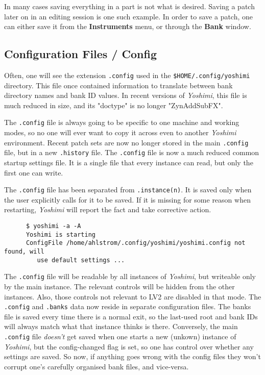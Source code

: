    In many cases saving everything in a part is not what is desired.
   Saving a patch later on in an editing session is one such example.
   In order to save a patch, one can either save it from the
   \textbf{Instruments} menu, or through the \textbf{Bank} window.

\subsection{Configuration Files / Config}
\label{subsec:configuration_config}

   Often, one will see the extension \texttt{.config} used in the
   \texttt{\$HOME/.config/yoshimi} directory.  This file once contained
   information to translate between bank directory names and bank ID
   values.  In recent versions of \textsl{Yoshimi}, this file is much
   reduced in size, and its "doctype" is no longer "ZynAddSubFX".

   The \texttt{.config} file is always going to be specific to one machine and
   working modes, so no one will ever want to copy it across even to another
   \textsl{Yoshimi} environment.  Recent patch sets are now no longer stored in
   the main \texttt{.config} file, but in a new \texttt{.history} file.  The
   \texttt{.config} file is now a much reduced common startup settings
   file.  It is a single file that every instance can read, but only the
   first one can write.

   The \texttt{.config} file has been separated from \texttt{.instance(n)}.
   It is saved only when the user explicitly calls for it to be saved. If
   it is missing for some reason when restarting, \textsl{Yoshimi} will
   report the fact and take corrective action.

   \begin{verbatim}
      $ yoshimi -a -A
      Yoshimi is starting
      ConfigFile /home/ahlstrom/.config/yoshimi/yoshimi.config not found, will
         use default settings ...
   \end{verbatim}

   The \texttt{.config} file will be readable by all instances of
   \textsl{Yoshimi}, but writeable only by the main instance. The relevant
   controls will be hidden from the other instances.  Also, those controls not
   relevant to LV2 are disabled in that mode.  The \texttt{.config} and
   \texttt{.banks} data now reside in separate configuration files.  The banks
   file is saved every time there is a normal exit, so the last-used root and
   bank IDs will always match what that instance thinks is there.  Conversely,
   the main \texttt{.config} file \textsl{doesn't} get saved when one starts a
   new (unkown) instance of \textsl{Yoshimi}, but the config-changed flag is
   set, so one has control over whether any settings are saved.  So now, if
   anything goes wrong with the config files they won't corrupt one's carefully
   organised bank files, and vice-versa.

